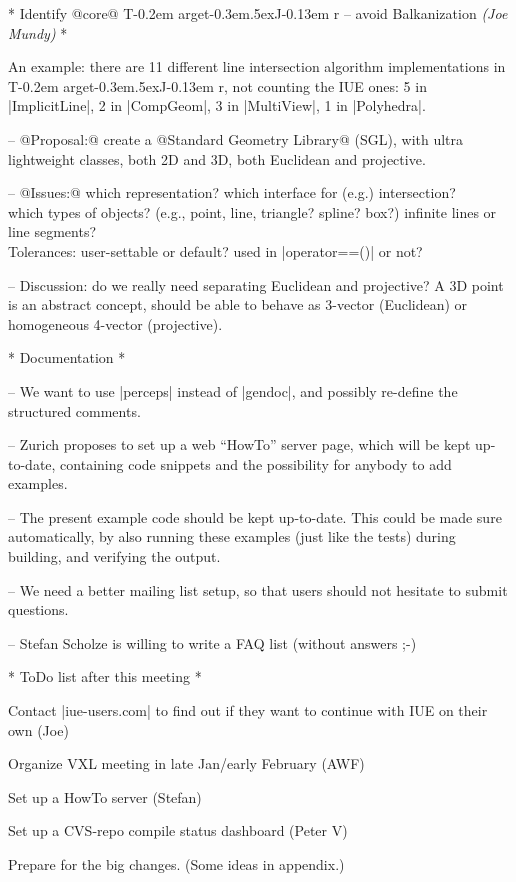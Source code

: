 \documentclass[11pt]{article}
\makeatletter
\def\TargetJr{{T\kern-0.2em arget\kern-0.3em\lower.5ex\hbox{\Large J}\kern-0.13em r}}
\def\by#1.{{\normalsize\sf\it(#1)}}\relax
\edef\@{@}\edef\<{<}\edef\|{|}
\makeatother
\begin{document}
* Identify @core@ \TargetJr{} -- avoid Balkanization \by Joe Mundy. *

An example: there are 11 different line intersection algorithm implementations
in \TargetJr, not counting the IUE ones: 5 in |ImplicitLine|, 2 in |CompGeom|,
3 in |MultiView|, 1 in |Polyhedra|.

-- @Proposal:@  create a @Standard Geometry Library@ (SGL),
with ultra lightweight classes, both 2D and 3D, both Euclidean and projective.

-- @Issues:@ which representation? which interface for (e.g.) intersection? \\
which types of objects? (e.g., point, line, triangle? spline? box?)
infinite lines or line segments? \\
Tolerances: user-settable or default? used in |operator==()| or not?

-- Discussion: do we really need separating Euclidean and projective?
A 3D point is an abstract concept, should be able to behave as 3-vector
(Euclidean) or homogeneous 4-vector (projective).


* Documentation *

-- We want to use |perceps| instead of |gendoc|, and possibly re-define the
structured comments.

-- Zurich proposes to set up a web ``HowTo'' server page, which will be kept
up-to-date, containing code snippets and the possibility for anybody to add
examples.

-- The present example code should be kept up-to-date.  This could be made
sure automatically, by also running these examples (just like the tests)
during building, and verifying the output.

-- We need a better mailing list setup, so that users should not hesitate
to submit questions.

-- Stefan Scholze is willing to write a FAQ list (without answers ;-)


* ToDo list after this meeting * %

Contact |iue-users\@aai.com| to find out if they want to continue with IUE
on their own (Joe)

Organize VXL meeting in late Jan/early February (AWF)

Set up a HowTo server (Stefan)

Set up a CVS-repo compile status dashboard (Peter V)

Prepare for the big changes.  (Some ideas in appendix.)
\end{document}
